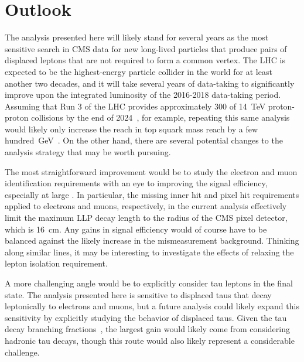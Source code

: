 \section{Outlook}
\label{outlook}
The analysis presented here will likely stand for several years as the most sensitive search in CMS data for new long-lived particles that produce pairs of displaced leptons that are not required to form a common vertex. The LHC is expected to be the highest-energy particle collider in the world for at least another two decades, and it will take several years of data-taking to significantly improve upon the integrated luminosity of the 2016-2018 data-taking period. Assuming that Run 3 of the LHC provides approximately \SI{300}{\fbinv} of \SI{14}{\TeV} proton-proton collisions by the end of 2024~\cite{run3_constraints, lhc_schedule}, for example, repeating this same analysis would likely only increase the reach in top squark mass reach by a few hundred~\si{\GeV}~\cite{collider_reach}. On the other hand, there are several potential changes to the analysis strategy that may be worth pursuing.

The most straightforward improvement would be to study the electron and muon identification requirements with an eye to improving the signal efficiency, especially at large \ad. In particular, the missing inner hit and pixel hit requirements applied to electrons and muons, respectively, in the current analysis effectively limit the maximum LLP decay length to the radius of the CMS pixel detector, which is \SI{16}{\cm}. Any gains in signal efficiency would of course have to be balanced against the likely increase in the mismeasurement background. Thinking along similar lines, it may be interesting to investigate the effects of relaxing the lepton isolation requirement.

A more challenging angle would be to explicitly consider tau leptons in the final state. The analysis presented here is sensitive to displaced taus that decay leptonically to electrons and muons, but a future analysis could likely expand this sensitivity by explicitly studying the \ad behavior of displaced taus. Given the tau decay branching fractions~\cite{pdg_2020}, the largest gain would likely come from considering hadronic tau decays, though this route would also likely represent a considerable challenge.

